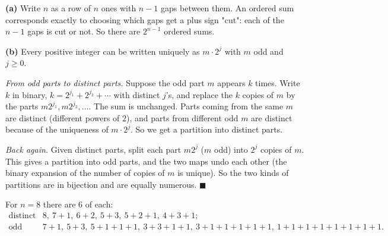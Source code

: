 \textbf{(a)} Write $n$ as a row of $n$ ones with $n-1$ gaps between them. An ordered sum corresponds exactly to choosing which gaps get a plus sign "cut": each of the $n-1$ gaps is cut or not. So there are $\boxed{2^{n-1}}$ ordered sums.

\textbf{(b)} Every positive integer can be written uniquely as $m\cdot2^j$ with $m$ odd and $j\ge0$.

\emph{From odd parts to distinct parts.} Suppose the odd part $m$ appears $k$ times. Write $k$ in binary, $k=2^{j_1}+2^{j_2}+\cdots$ with distinct $j$'s, and replace the $k$ copies of $m$ by the parts $m2^{j_1}, m2^{j_2},\dots$. The sum is unchanged. Parts coming from the same $m$ are distinct (different powers of $2$), and parts from different odd $m$ are distinct because of the uniqueness of $m\cdot2^j$. So we get a partition into distinct parts.

\emph{Back again.} Given distinct parts, split each part $m2^j$ ($m$ odd) into $2^j$ copies of $m$. This gives a partition into odd parts, and the two maps undo each other (the binary expansion of the number of copies of $m$ is unique). So the two kinds of partitions are in bijection and are equally numerous. $\blacksquare$

For $n=8$ there are $6$ of each:
\[
\begin{array}{ll}
\text{distinct parts:} & 8,\ 7+1,\ 6+2,\ 5+3,\ 5+2+1,\ 4+3+1;\\
\text{odd parts:} & 7+1,\ 5+3,\ 5+1+1+1,\ 3+3+1+1,\ 3+1+1+1+1+1,\ 1+1+1+1+1+1+1+1.
\end{array}
\]
